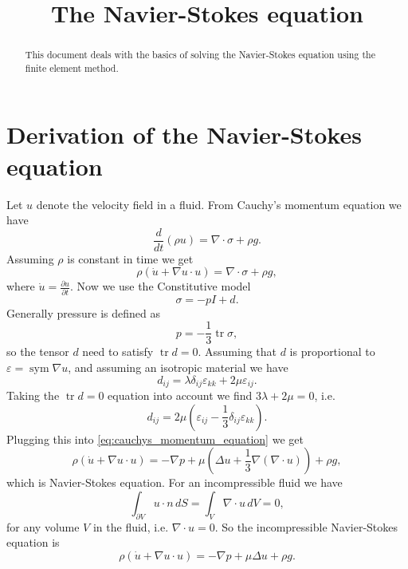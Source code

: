 \documentclass[a4paper,10pt]{article}
\DeclareMathOperator{\tr}{tr}
\DeclareMathOperator{\sym}{sym}
\begin{document}
\title{The Navier-Stokes equation}
\maketitle

\begin{abstract}
\noindent
This document deals with the basics of solving the Navier-Stokes equation using
the finite element method.
\end{abstract}

\section{Derivation of the Navier-Stokes equation}
Let $u$ denote the velocity field in a fluid. From Cauchy's momentum equation we
have
\[
\frac{d}{dt} (\rho u) = \nabla \cdot \sigma + \rho g.
\]
Assuming $\rho$ is constant in time we get
\begin{equation} \label{eq:cauchys_momentum_equation}
\rho (\dot{u} + \nabla u \cdot u) = \nabla \cdot \sigma + \rho g,
\end{equation}
where $\dot{u} = \frac{\partial u}{\partial t}$. Now we use the Constitutive
model
\[
\sigma = -p I + d.
\]
Generally pressure is defined as
\[
p = -\frac{1}{3} \tr \sigma,
\]
so the tensor $d$ need to satisfy $\tr d = 0$. Assuming that $d$ is proportional
to $\varepsilon = \sym \nabla u$, and assuming an isotropic material we have
\[
d_{ij} = \lambda \delta_{ij} \varepsilon_{kk} + 2 \mu \varepsilon_{ij}.  
\]
Taking the $\tr d = 0$ equation into account we find $3 \lambda + 2 \mu = 0$,
i.e.
\[
d_{ij} = 2 \mu \left( \varepsilon_{ij} - \frac{1}{3} \delta_{ij} \varepsilon_{kk} \right).
\]
Plugging this into \eqref{eq:cauchys_momentum_equation} we get
\[
\rho (\dot{u} + \nabla u \cdot u) 
= -\nabla p 
+ \mu \left( \Delta u + \frac{1}{3} \nabla (\nabla \cdot u) \right) 
+ \rho g,
\]
which is Navier-Stokes equation. For an incompressible fluid we have
\[
\int_{\partial V} u \cdot n \, dS = \int_V \nabla \cdot u \, dV = 0,
\]
for any volume $V$ in the fluid, i.e. $\nabla \cdot u = 0$. So the
incompressible Navier-Stokes equation is
\[
\rho (\dot{u} + \nabla u \cdot u) 
= -\nabla p 
+ \mu \Delta u
+ \rho g.
\]
\end{document}
